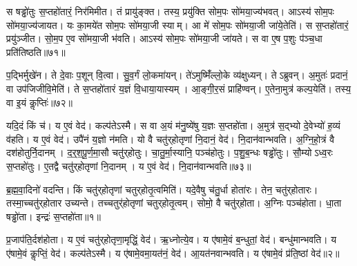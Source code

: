 स षड्ढो॑तुः स॒प्तहो॑तारं॒ निर॑मिमीत।
तं प्रायु॑ङ्क्त।
तस्य॒ प्रयु॑क्ति सोम॒पः सो॑मया॒ज्य॑भवत्।
आऽस्य॑ सोम॒पः सो॑मया॒ज्य॑जायत।
यः का॒मये॑त सोम॒पः सो॑मया॒जी स्याम्।
आ मे॑ सोम॒पः सो॑मया॒जी जा॑ये॒तेति॑।
स स॒प्तहो॑तारं॒ प्रयु॑ञ्जीत।
सो॒म॒प ए॒व सो॑मया॒जी भ॑वति।
आऽस्य॑ सोम॒पः सो॑मया॒जी जा॑यते।
स वा ए॒ष प॒शुः प॑ञ्च॒धा प्रति॑तिष्ठति॥७१॥

प॒द्भिर्मुखे॑न।
ते दे॒वाः प॒शून् वि॒त्वा।
सु॒व॒र्गं लो॒कमा॑यन्।
ते॑ऽमुष्मिँ॑ल्लो॒के व्य॑क्षुध्यन्।
तेऽब्रुवन्।
अ॒मुतः॑ प्रदानं॒ वा उप॑जिजीवि॒मेति॑।
ते स॒प्तहो॑तारं य॒ज्ञं वि॒धाया॒यास्यम्।
आ॒ङ्गी॒र॒सं प्राहि॑ण्वन्।
ए॒तेना॒मुत्र॑ कल्प॒येति॑।
तस्य॒ वा इ॒यं कॢप्तिः॑॥७२॥

यदि॒दं किं च॑।
य ए॒वं वेद॑।
कल्प॑ते\-ऽस्मै।
स वा अ॒यं म॑नु॒ष्ये॑षु य॒ज्ञः स॒प्तहो॑ता।
अ॒मुत्र॑ स॒द्भ्यो दे॒वेभ्यो॑ ह॒व्यं व॑हति।
य ए॒वं वेद॑।
उपै॑नं य॒ज्ञो न॑मति।
यो वै चतु॑र्‌\mbox{}होतृणां नि॒दानं॒ वेद॑।
नि॒दान॑वान्भवति।
अ॒ग्नि॒हो॒त्रं वै दश॑होतुर्नि॒दानम्।
द॒र्‌॒\mbox{}श॒पू॒र्ण॒मा॒सौ चतु॑र्‌\mbox{}होतुः।
चा॒तु॒र्मा॒स्यानि॒ पञ्च॑होतुः।
प॒शु॒ब॒न्धः षड्ढो॑तुः।
सौ॒म्यो\-ऽध्व॒रः स॒प्तहो॑तुः।
ए॒तद्वै चतु॑र्‌\mbox{}होतृणां नि॒दानम्।
य ए॒वं वेद॑।
नि॒दान॑वान्भवति॥७३॥\anuvakamend[अ॒मि॒मी॒त॒ तं प्रायु॑ङ्क्त॒ पञ्च॑होतारं॒ प्र यु॑ञ्जीत जाये॒तेति॑ तिष्ठति॒ कॢप्ति॒र्दश॑होतुर्नि॒दानꣳ॑ स॒प्त च॑]




\clearpage
{}
\setcounter{anuvakam}{0}

ब्र॒ह्म॒वा॒दिनो॑ वदन्ति।
किं चतु॑र्‌\mbox{}होतृणां चतुर्‌\mbox{}होतृ॒त्वमिति॑।
यदे॒वैषु च॑तु॒र्धा होता॑रः।
तेन॒ चतु॑र्‌\mbox{}होतारः।
तस्मा॒च्चतु॑र्‌\mbox{}होतार उच्यन्ते।
तच्चतुर्॑होतृणां चतुर्‌\mbox{}होतृ॒त्वम्।
सोमो॒ वै चतु॑र्‌\mbox{}होता।
अ॒ग्निः पञ्च॑होता।
धा॒ता षड्ढो॑ता।
इन्द्रः॑ स॒प्तहो॑ता॥१॥

प्र॒जाप॑ति॒र्दश॑होता।
य ए॒वं चतु॑र्‌\mbox{}होतृणा॒मृद्धिं॒ वेद॑।
ऋ॒ध्नोत्ये॒व।
य ए॑षामे॒वं ब॒न्धुतां॒ वेद॑।
बन्धु॑मान्भवति।
य ए॑षामे॒वं कॢप्तिं॒ वेद॑।
कल्प॑ते\-ऽस्मै।
य ए॑षामे॒वमा॒यत॑नं॒ वेद॑।
आ॒यत॑नवान्भवति।
य ए॑षामे॒वं प्र॑ति॒ष्ठां वेद॑॥२॥

